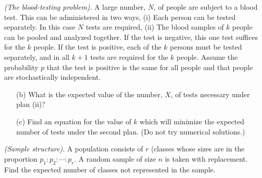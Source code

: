 \begin{problem}[Handout 6, \# 12]
  \emph{(The blood-testing problem).} A large number, \(N\), of people are
  subject to a blood test. This can be administered in two ways, (i) Each
  person can be tested separately. In this case \(N\) tests are required,
  (ii) The blood samples of \(k\) people can be pooled and analyzed
  together. If the test is negative, this one test suffices for the \(k\)
  people. If the test is positive, each of the \(k\) persons must be tested
  separately, and in all \(k+1\) tests are required for the \(k\)
  people. Assume the probability \(p\) that the test is positive is the
  same for all people and that people are stochastically independent.
  \begin{itemize}[noitemsep]
  \item[(b)] What is the expected value of the number, \(X\), of tests
    necessary under plan (ii)?
  \item[(c)] Find an equation for the value of \(k\) which will minimize
    the expected number of tests under the second plan. (Do not try
    numerical solutions.)
  \end{itemize}
  \end{problem}
\begin{solution}

\end{solution}
\newpage

\begin{problem}[Handout 6, \# 13]
  \emph{(Sample structure).} A population consists of \(r\) (classes whose
  sizes are in the proportion \(p_1:p_2:\dotsb:p_r\). A random sample of
  size \(n\) is taken with replacement. Find the expected number of classes
  not represented in the sample.
\end{problem}
\begin{solution}

\end{solution}

